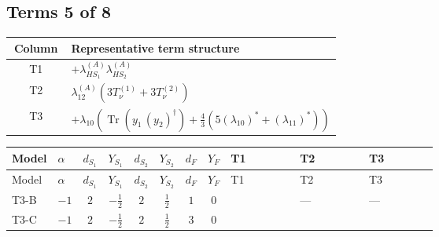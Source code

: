 \documentclass[8pt]{article}
\begin{document}
\begin{landscape}
\subsection*{Terms 5 of 8}
\begin{center}
\begin{tabular}{@{}c >{\raggedright\arraybackslash}p{0.82\linewidth}@{}}
\toprule
Column & Representative term structure \\
\midrule
T1 & \(\displaystyle +{\lambda_{HS_1}^{(A)}} {\lambda_{HS_2}^{(A)}}\) \\
\midrule
T2 & \(\displaystyle {\lambda_{12}^{(A)}} (3 T_{\nu}^{(1)}+3 T_{\nu}^{(2)})\) \\
\midrule
T3 & \(\displaystyle +{\lambda_{10}} \left(\operatorname{Tr}\!\left({y_1}\,\left({y_2}\right)^{\dagger}\right)+\frac{4}{3} (5 \left({\lambda_{10}}\right)^{*}+\left({\lambda_{11}}\right)^{*})\right)\) \\
\midrule
\bottomrule
\end{tabular}
\end{center}
\smallskip
\tiny
\begin{longtable}{@{}llcccccc >{\raggedright\arraybackslash}p{0.21\linewidth} >{\raggedright\arraybackslash}p{0.21\linewidth} >{\raggedright\arraybackslash}p{0.21\linewidth}@{}}
\toprule
Model & $\alpha$ & $d_{S_1}$ & $Y_{S_1}$ & $d_{S_2}$ & $Y_{S_2}$ & $d_F$ & $Y_F$ & T1 & T2 & T3 \\
\midrule
\endfirsthead
\toprule
Model & $\alpha$ & $d_{S_1}$ & $Y_{S_1}$ & $d_{S_2}$ & $Y_{S_2}$ & $d_F$ & $Y_F$ & T1 & T2 & T3 \\
\midrule
\endhead
T3-B & $-1$ & $2$ & $-\frac{1}{2}$ & $2$ & $\frac{1}{2}$ & $1$ & $0$ & \scriptsize\adjustbox{max width=\linewidth}{$\begin{gathered} +{\lambda_{HS_1}^{(A)}} {\lambda_{HS_2}^{(A)}}\end{gathered}$} & --- & --- \\
\midrule
T3-C & $-1$ & $2$ & $-\frac{1}{2}$ & $2$ & $\frac{1}{2}$ & $3$ & $0$ & \scriptsize\adjustbox{max width=\linewidth}{$\begin{gathered} +{\lambda_{HS_1}^{(A)}} {\lambda_{HS_2}^{(A)}}\end{gathered}$} & \scriptsize\adjustbox{max width=\linewidth}{$\begin{gathered} {\lambda_{12}^{(A)}} (3 T_{\nu}^{(1)}+3 T_{\nu}^{(2)})\end{gathered}$} & \scriptsize\adjustbox{max width=\linewidth}{$\begin{gathered} +{\lambda_{10}} \left(\operatorname{Tr}\!\left({y_1}\,\left({y_2}\right)^{\dagger}\right)+\frac{4}{3} (5 \left({\lambda_{10}}\right)^{*}+\left({\lambda_{11}}\right)^{*})\right)\end{gathered}$} \\

\end{longtable}
\end{landscape}
\end{document}
